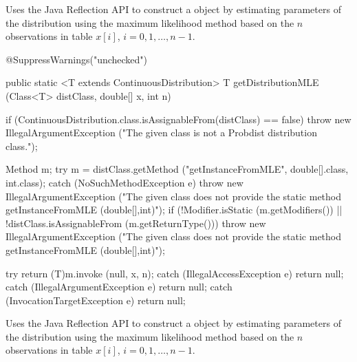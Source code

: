 \begin{tabb}
   Uses the Java Reflection API to construct a 
   object by estimating parameters of the distribution using the maximum likelihood
   method based on the $n$ observations in table $x[i]$, $i = 0, 1, \ldots, n-1$.
\end{tabb}
\begin{htmlonly}
\end{htmlonly}
\begin{code}

\begin{hide} @SuppressWarnings("unchecked")
\end{hide}   public static <T extends ContinuousDistribution> T getDistributionMLE
                    (Class<T> distClass, double[] x, int n)\begin{hide} {
      if (ContinuousDistribution.class.isAssignableFrom(distClass) == false)
               throw new IllegalArgumentException 
                  ("The given class is not a Probdist distribution class.");

      Method m;
      try
      {
         m = distClass.getMethod ("getInstanceFromMLE", double[].class, int.class);
      }
      catch (NoSuchMethodException e) {
         throw new IllegalArgumentException
         ("The given class does not provide the static method getInstanceFromMLE (double[],int)");
      }
      if (!Modifier.isStatic (m.getModifiers()) ||
          !distClass.isAssignableFrom (m.getReturnType()))
         throw new IllegalArgumentException
         ("The given class does not provide the static method getInstanceFromMLE (double[],int)");
      
      try
      {
         return (T)m.invoke (null, x, n);
      }
      catch (IllegalAccessException e) {
         return null;
      }
      catch (IllegalArgumentException e) {
         return null;
      }
      catch (InvocationTargetException e) {
         return null;
      }      
   }\end{hide}
\end{code}
\begin{tabb}
   Uses the Java Reflection API to construct a 
   object by estimating parameters of the distribution using the maximum likelihood
   method based on the $n$ observations in table $x[i]$, $i = 0, 1, \ldots, n-1$.
\end{tabb}
